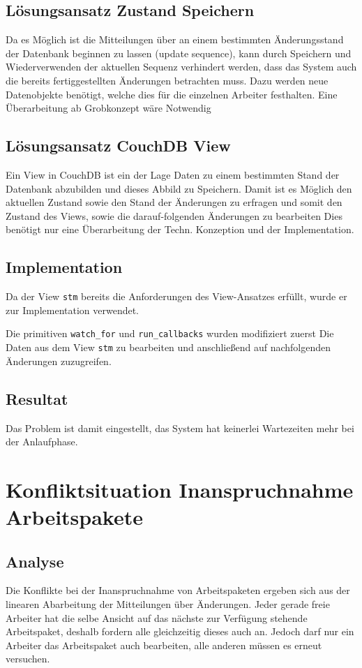 \subsection{Lösungsansatz Zustand Speichern}

Da es Möglich ist die Mitteilungen über an einem bestimmten Änderungsstand der 
Datenbank beginnen zu lassen (update sequence),
kann durch Speichern und Wiederverwenden der aktuellen Sequenz verhindert werden,
dass das System auch die bereits fertiggestellten Änderungen betrachten muss.
Dazu werden neue Datenobjekte benötigt, welche dies für die einzelnen Arbeiter festhalten. Eine Überarbeitung ab Grobkonzept wäre Notwendig


\subsection{Lösungsansatz CouchDB View}

Ein View in CouchDB ist ein der Lage Daten zu einem bestimmten Stand der Datenbank abzubilden und dieses Abbild zu Speichern.
Damit ist es Möglich den aktuellen Zustand sowie den Stand der Änderungen zu erfragen und somit den Zustand des Views, sowie die darauf-folgenden Änderungen zu bearbeiten 
Dies benötigt nur eine Überarbeitung der Techn. Konzeption und der Implementation.

\subsection{Implementation}
Da der View \verb|stm| bereits die Anforderungen des View-Ansatzes erfüllt,
wurde er zur Implementation verwendet.

Die primitiven \verb|watch_for| und \verb|run_callbacks| wurden modifiziert zuerst
Die Daten aus dem View \verb|stm| zu bearbeiten und anschließend 
auf nachfolgenden Änderungen zuzugreifen.

\subsection{Resultat}
Das Problem ist damit eingestellt, das System hat keinerlei Wartezeiten mehr bei der Anlaufphase.


\section{Konfliktsituation Inanspruchnahme Arbeitspakete}
\subsection{Analyse}
Die Konflikte bei der Inanspruchnahme von Arbeitspaketen ergeben sich aus der linearen Abarbeitung der Mitteilungen über Änderungen.
Jeder gerade freie Arbeiter hat die selbe Ansicht auf das nächste zur Verfügung stehende Arbeitspaket, deshalb fordern alle gleichzeitig dieses auch an.
Jedoch darf nur ein Arbeiter das Arbeitspaket auch bearbeiten,
alle anderen müssen es erneut versuchen.

